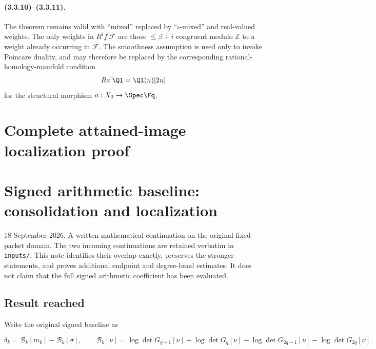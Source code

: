 \paragraph{(3.3.10)--(3.3.11).}
The theorem remains valid with ``mixed'' replaced by ``$\iota$-mixed'' and real-valued weights. The only weights in $R^if_{!}\mathcal F$ are those $\le\beta+i$ congruent modulo $\mathbb Z$ to a weight already occurring in $\mathcal F$. The smoothness assumption is used only to invoke Poincare duality, and may therefore be replaced by the corresponding rational-homology-manifold condition
\[
Ra^!\Ql=\Ql(n)[2n]
\]
for the structural morphism $a:X_0\to\Spec\Fq$.


\endgroup

\clearpage
\begingroup


\setcounter{equation}{0}
\renewcommand{\theequation}{LOC.\arabic{equation}}
\section*{Complete attained-image localization proof}
\section{Signed arithmetic baseline: consolidation and localization}\label{loc:signed-arithmetic-baseline-consolidation-and-localization}

18 September 2026. A written mathematical continuation on the original fixed-packet domain. The two incoming continuations are retained verbatim in \texttt{inputs/}. This note identifies their overlap exactly, preserves the stronger statements, and proves additional endpoint and degree-band estimates. It does not claim that the full signed arithmetic coefficient has been evaluated.

\subsection{Result reached}\label{loc:result-reached}

Write the original signed baseline as

\[
\delta_k=\mathcal B_k[m_k]-\mathcal B_k[\sigma],\qquad
\mathcal B_k[\nu]=\log\det G_{q-1}[\nu]+\log\det G_q[\nu]
-\log\det G_{2q-1}[\nu]-\log\det G_{2q}[\nu].
\]

